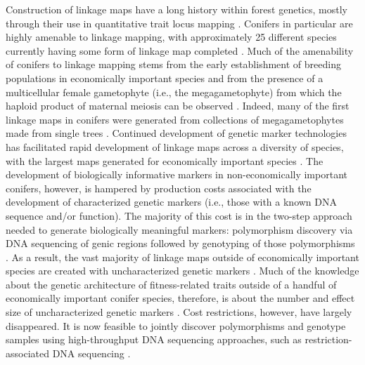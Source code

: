\documentclass[11pt]{article}
\begin{document}
Construction of linkage maps have a long history within forest genetics, mostly through their use in quantitative trait locus 
mapping \citep{Ritland:2011}. Conifers in particular are highly amenable to linkage mapping, with approximately 25 different 
species currently having some form of linkage map completed \citep[see Table 5-1 in][]{Ritland:2011}. Much of the amenability of 
conifers to linkage mapping stems from the early establishment of breeding populations in economically important species and from 
the presence of a multicellular female gametophyte (i.e., the megagametophyte) from which the haploid product of maternal meiosis 
can be observed \citep{Cairney:2007}. Indeed, many of the first linkage maps in conifers were generated from collections of 
megagametophytes made from single trees \citep{Tulsieram:1992, Nelson:1993, Kubisiak:1996}. Continued development 
of genetic marker technologies has facilitated rapid development of linkage maps across a diversity of species, with the largest maps 
generated for economically important species \citep[e.g.][] {Achere:2004, Kang:2010, Martinez-Garcia:2013}. 
The development of biologically informative markers in non-economically important conifers, however, is hampered by production costs 
associated with the development of characterized  genetic markers (i.e., those with a known DNA sequence and/or function). 
The majority of this cost is in the two-step approach needed to generate biologically 
meaningful markers: polymorphism discovery via DNA sequencing of genic regions followed by genotyping of those polymorphisms 
\citep[cf.][]{Eckert:2013a}. As a result, the vast majority of linkage maps outside of economically important 
species are created with uncharacterized genetic markers \citep[e.g.,][]{Travis:1998}. Much of the knowledge about the genetic 
architecture of fitness-related traits outside of a handful of economically important conifer species, therefore, is about the 
number and effect size of uncharacterized genetic markers \citep{Ritland:2011}. Cost restrictions, however, have largely disappeared. 
It is now feasible to jointly discover polymorphisms and genotype samples using high-throughput DNA sequencing 
approaches, such as restriction-associated DNA sequencing \citep [RADseq; e.g.,][] {Peterson:2012}. 
\end{document}
